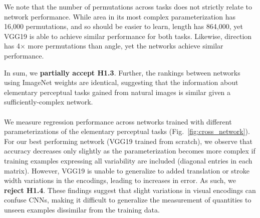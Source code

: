 We note that the number of permutations across tasks does not strictly relate to network performance. While area in its most complex parameterization has 16,000 permutations, and so should be easier to learn, length has 864,000, yet VGG19 is able to achieve similar performance for both tasks. Likewise, direction has 4$\times$ more permutations than angle, yet the networks achieve similar performance. %

In sum, we \textbf{partially accept H1.3}. Further, the rankings between networks using ImageNet weights are identical, suggesting that the information about elementary perceptual tasks gained from natural images is similar given a sufficiently-complex network.
\\~\\
 We measure regression performance across networks trained with different parameterizations of the elementary perceptual tasks (Fig.~\ref{fig:cross_network}). For our best performing network (VGG19 trained from scratch), we observe that accuracy decreases only slightly as the parameterization becomes more complex if training examples expressing all variability are included (diagonal entries in each matrix).  However, VGG19 is unable to generalize to added translation or stroke width variations in the encodings, leading to increases in error. As such, we \textbf{reject H1.4}. These findings suggest that slight variations in visual encodings can confuse CNNs, making it difficult to generalize the measurement of quantities to unseen examples dissimilar from the training data.




